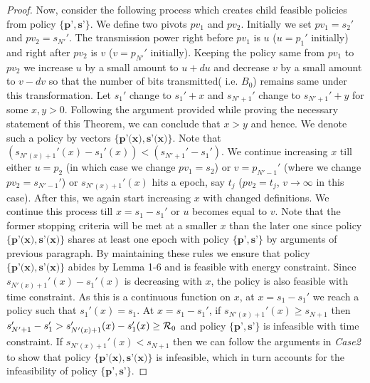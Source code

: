\begin{proof}
Now, consider the following process which creates child feasible policies from policy $\{\textbf{p'},\textbf{s'}\}$. We define two pivots $pv_1$ and $pv_2$. Initially we set $pv_1=s_2'$ and $pv_2=s_{N'}'$. The transmission power right before $pv_1$ is $u$ ($u=p_1'$ initially) and right after $pv_2$ is $v$ ($v=p_{N'}'$ initially). Keeping the policy same from $pv_1$ to $pv_2$ we increase $u$ by a small amount to $u+du$ and decrease $v$ by a small amount to $v-dv$ so that the number of bits transmitted( i.e. $B_0$) remains same under this transformation. Let $s_1'$ change to $s_1'+x$ and $s_{N'+1}'$ change to $s_{N'+1}'+y$ for some $x,y>0$. Following the argument provided while proving the necessary statement of this Theorem, we can conclude that $x>y$ and hence. We denote such a policy by vectors $\{\textbf{p'(x)},\textbf{s'(x)}\}$. Note that $(s_{N'(x)+1}'(x)-s_1'(x))<(s_{N'+1}'-s_1')$. We continue increasing $x$ till either $u=p_2$ (in which case we change $pv_1=s_2$) or $v=p_{N'-1}'$ (where we change $pv_2=s_{N'-1}'$) or $s_{N'(x)+1}'(x)$ hits a epoch, say $t_j$ ($pv_2=t_j$, $v\rightarrow\infty$ in this case). After this, we again start increasing $x$ with changed definitions. We continue this process till $x=s_1-s_1'$  or $u$ becomes equal to $v$. Note that the former stopping criteria will be met at a smaller $x$ than the later one since policy $\{\textbf{p'(x)},\textbf{s'(x)}\}$ shares at least one epoch with policy $\{\textbf{p'},\textbf{s'}\}$ by arguments of previous paragraph. By maintaining these rules we ensure that policy $\{\textbf{p'(x)},\textbf{s'(x)}\}$ abides by Lemma 1-6 and is feasible with energy constraint. Since $s_{N'(x)+1}'(x)-s_1'(x)$ is decreasing with $x$, the policy is also feasible with time constraint. As this is a continuous function on $x$, at $x=s_1-s_1'$ we reach a policy such that $s_1'(x)=s_1$. At $x=s_1-s_1'$, if $s_{N'(x)+1}'(x)\ge s_{N+1}$ then $s_{N'+1}'-s_1'>s_{N'(x)+1}'(x)-s_1'(x)\ge \mathcal{R}_0$ and policy $\{\textbf{p'},\textbf{s'}\}$ is infeasible with time constraint. If $s_{N'(x)+1}'(x)< s_{N+1}$ then we can follow the arguments in \textit{Case2} to show that policy $\{\textbf{p'(x)},\textbf{s'(x)}\}$ is infeasible, which in turn accounts for the infeasibility of policy $\{\textbf{p'},\textbf{s'}\}$.
\end{proof}

























